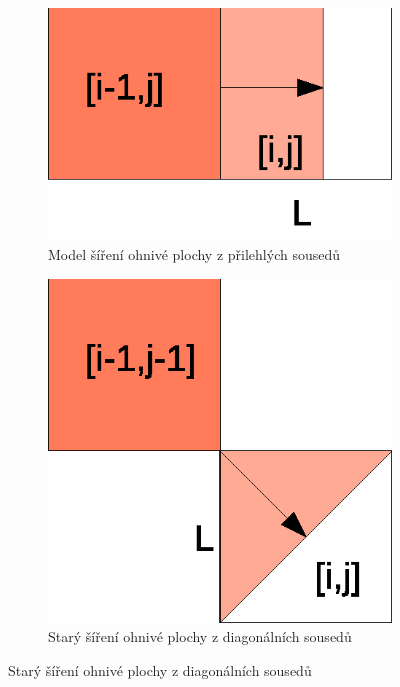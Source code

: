 \documentclass[11pt,a4paper]{scrartcl}
\begin{document}
	\begin{figure}[H]
		\centering
		\begin{subfigure}{0.3 \textwidth}
			\includegraphics[width=\linewidth]{model-adj-spread}
			\caption{Model šíření ohnivé plochy z přilehlých sousedů}
			\label{fig:adj-model}
		\end{subfigure}
		\begin{subfigure}{0.3 \textwidth}
			\includegraphics[width=\linewidth]{old-model-diag-spread}
			\caption{Starý šíření ohnivé plochy z diagonálních sousedů}

\end{subfigure}
\end{figure}
\end{document}
